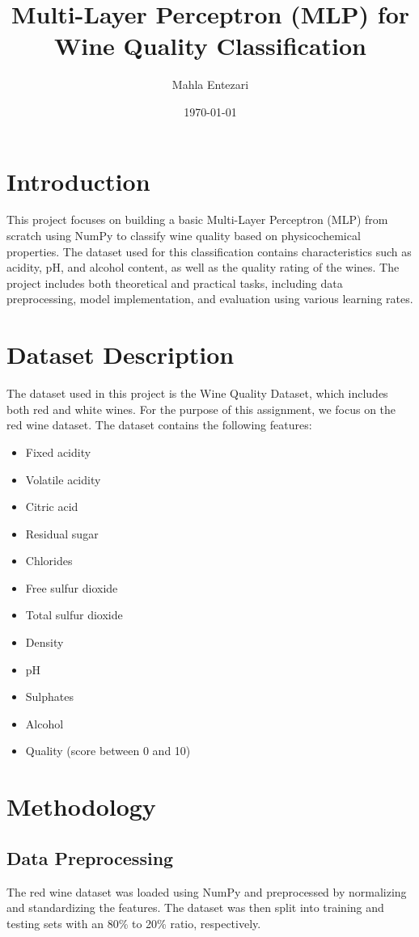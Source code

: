\documentclass[12pt]{article}
\title{Multi-Layer Perceptron (MLP) for Wine Quality Classification}
\author{Mahla Entezari}
\date{\today}
\begin{document}
\maketitle

\section{Introduction}
This project focuses on building a basic Multi-Layer Perceptron (MLP) from scratch using NumPy to classify wine quality based on physicochemical properties. The dataset used for this classification contains characteristics such as acidity, pH, and alcohol content, as well as the quality rating of the wines. The project includes both theoretical and practical tasks, including data preprocessing, model implementation, and evaluation using various learning rates.

\section{Dataset Description}
The dataset used in this project is the Wine Quality Dataset, which includes both red and white wines. For the purpose of this assignment, we focus on the red wine dataset. The dataset contains the following features:

\begin{itemize}
    \item Fixed acidity
    \item Volatile acidity
    \item Citric acid
    \item Residual sugar
    \item Chlorides
    \item Free sulfur dioxide
    \item Total sulfur dioxide
    \item Density
    \item pH
    \item Sulphates
    \item Alcohol
    \item Quality (score between 0 and 10)
\end{itemize}

\section{Methodology}
\subsection{Data Preprocessing}
The red wine dataset was loaded using NumPy and preprocessed by normalizing and standardizing the features. The dataset was then split into training and testing sets with an 80\% to 20\% ratio, respectively.
\end{document}
